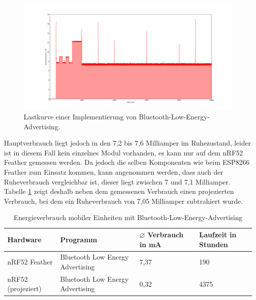 \begin{figure}[h!]
  \centering
	\includegraphics[width=\textwidth]{plots/blue.png}
  \caption{Lastkurve einer Implementierung von Bluetooth-Low-Energy-Advertising.}
  \label{fig:blue}
\end{figure}

Hauptverbrauch liegt jedoch in den 7,2 bis 7,6 Milliamper im Ruhezustand, leider ist in diesem Fall kein einzelnes Modul vorhanden, es kann nur auf dem nRF52 Feather gemessen werden.
Da jedoch die selben Komponenten wie beim ESP8266 Feather zum Einsatz kommen, kann angenommen werden, dass auch der Ruheverbrauch vergleichbar ist, dieser liegt zwischen 7 und 7,1 Milliamper.
Tabelle \ref{table:blueina} zeigt deshalb neben dem gemessenen Verbrauch einen projezierten Verbrauch, bei dem ein Ruheverbrauch von 7,05 Milliamper subtrahiert wurde.

\begin{table}[h!]
	\centering
	\caption{Energieverbrauch mobiler Einheiten mit Bluetooth-Low-Energy-Advertising}
	\label{table:blueina}
	\begin{tabular}{p{3.5cm}|p{5cm}|p{2.5cm}|p{2.5cm}}
		Hardware & Programm & $\varnothing$ Verbrauch in mA & Laufzeit in Stunden\\
		\hline
		nRF52 Feather & Bluetooth Low Energy Advertising & 7,37 & 190\\
		nRF52 (projeziert) & Bluetooth Low Energy Advertising & 0,32 & 4375\\
	\end{tabular}
\end{table}






